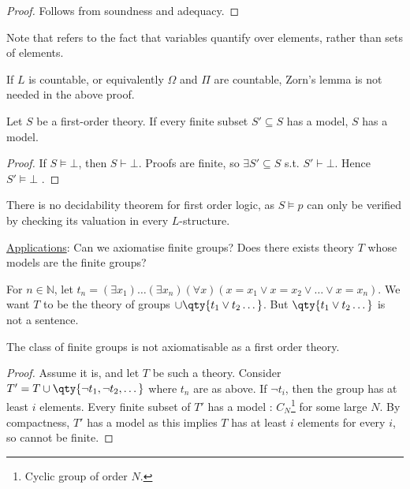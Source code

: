 \begin{proof}
    Follows from soundness and adequacy.
\end{proof}

Note that  refers to the fact that variables quantify over elements, rather than sets of elements.

\begin{remark}
    If $L$ is countable, or equivalently $\Omega$ and $\Pi$ are countable, Zorn's lemma is not needed in the above proof.
\end{remark}

\begin{theorem}
    Let $S$ be a first-order theory.
    If every finite subset $S' \subseteq S$ has a model, $S$ has a model.
\end{theorem}

\begin{proof}
    If $S \models \bot$, then $S \vdash \bot$.
    Proofs are finite, so $\exists S' \subseteq S$ s.t. $S' \vdash \bot$.
    Hence $S' \models \bot$ \Lightning.
\end{proof}

There is no decidability theorem for first order logic, as $S \models p$ can only be verified by checking its valuation in every $L$-structure.

\underline{Applications}: Can we axiomatise finite groups?
Does there exists theory $T$ whose models are the finite groups?

For $n \in \mathbb{N}$, let $t_n = (\exists x_1) \dots (\exists x_n) (\forall x) (x = x_1 \vee x = x_2 \vee \dots \vee x = x_n)$.
We want $T$ to be the theory of groups $\cup \qty{t_1 \vee t_2 \dots}$.
But $\qty{t_1 \vee t_2 \dots}$ is not a sentence.

\begin{corollary}
    The class of finite groups is not axiomatisable as a first order theory.
\end{corollary}

\begin{proof}
    Assume it is, and let $T$ be such a theory.
    Consider $T' = T \cup \qty{\neg t_1, \neg t_2, \dots}$ where $t_n$ are as above.
    If $\neg t_i$, then the group has at least $i$ elements.
    Every finite subset of $T'$ has a model : $C_N$\footnote{Cyclic group of order $N$.} for some large $N$.
    By compactness, $T'$ has a model \Lightning as this implies $T$ has at least $i$ elements for every $i$, so cannot be finite.
\end{proof}

